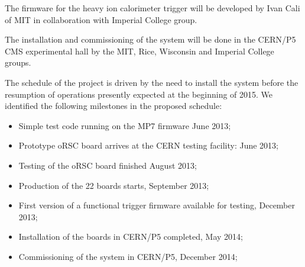 The firmware for the heavy ion calorimeter trigger will be developed by Ivan Cali of MIT in collaboration with Imperial College group. 

The installation and commissioning of the system will be done in the CERN/P5 CMS experimental hall by the MIT, Rice, Wisconsin and Imperial College groups.

The schedule of the project is driven by the need to install the system before the resumption of operations presently expected at the beginning of 2015. We identified the following milestones in the proposed schedule:

\begin{itemize}
\item Simple test code running on the MP7 firmware June 2013;
\item Prototype oRSC board arrives at the CERN testing facility: June 2013;
\item Testing of the oRSC board finished August 2013;
\item Production of the 22 boards starts, September 2013;
\item First version of a functional trigger firmware available for testing, December 2013;
\item Installation of the boards in CERN/P5 completed, May 2014;
\item Commissioning of the system in CERN/P5, December 2014;
\end{itemize}

